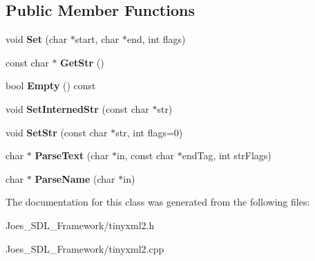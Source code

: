 \subsection*{Public Member Functions}
\begin{DoxyCompactItemize}
\item 
\hypertarget{classtinyxml2_1_1_str_pair_a4f05549373394266a1eecba26813c166}{void {\bfseries Set} (char $\ast$start, char $\ast$end, int flags)}\label{classtinyxml2_1_1_str_pair_a4f05549373394266a1eecba26813c166}

\item 
\hypertarget{classtinyxml2_1_1_str_pair_ad87e3d11330f5e689ba1e7e54c023b57}{const char $\ast$ {\bfseries Get\-Str} ()}\label{classtinyxml2_1_1_str_pair_ad87e3d11330f5e689ba1e7e54c023b57}

\item 
\hypertarget{classtinyxml2_1_1_str_pair_affa1043e73a18f05d5d2faec055725a7}{bool {\bfseries Empty} () const }\label{classtinyxml2_1_1_str_pair_affa1043e73a18f05d5d2faec055725a7}

\item 
\hypertarget{classtinyxml2_1_1_str_pair_a2baf6230e18333e02ab65d0897ee3941}{void {\bfseries Set\-Interned\-Str} (const char $\ast$str)}\label{classtinyxml2_1_1_str_pair_a2baf6230e18333e02ab65d0897ee3941}

\item 
\hypertarget{classtinyxml2_1_1_str_pair_a1f82ec6b5bee35ee7466d8565e43b1de}{void {\bfseries Set\-Str} (const char $\ast$str, int flags=0)}\label{classtinyxml2_1_1_str_pair_a1f82ec6b5bee35ee7466d8565e43b1de}

\item 
\hypertarget{classtinyxml2_1_1_str_pair_ad90521f188e9606a8fbafe5d86fb2246}{char $\ast$ {\bfseries Parse\-Text} (char $\ast$in, const char $\ast$end\-Tag, int str\-Flags)}\label{classtinyxml2_1_1_str_pair_ad90521f188e9606a8fbafe5d86fb2246}

\item 
\hypertarget{classtinyxml2_1_1_str_pair_aa6d8998efceba41d87ec2300c70a6085}{char $\ast$ {\bfseries Parse\-Name} (char $\ast$in)}\label{classtinyxml2_1_1_str_pair_aa6d8998efceba41d87ec2300c70a6085}

\end{DoxyCompactItemize}


The documentation for this class was generated from the following files\-:\begin{DoxyCompactItemize}
\item 
Joes\-\_\-\-S\-D\-L\-\_\-\-Framework/tinyxml2.\-h\item 
Joes\-\_\-\-S\-D\-L\-\_\-\-Framework/tinyxml2.\-cpp\end{DoxyCompactItemize}
